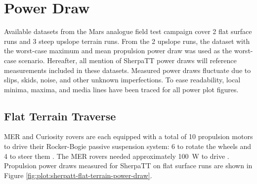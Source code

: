 \section{Power Draw}
\label{sec:PropulsionPowerConstraints:PowerDraw}
Available datasets from the Mars analogue field test campaign cover 2 flat surface runs and 3 steep upslope terrain runs. From the 2 upslope runs, the dataset with the worst-case maximum and mean propulsion power draw was used as the worst-case scenario. Hereafter, all mention of SherpaTT power draws will reference measurements included in these datasets. Measured power draws fluctuate due to slips, skids, noise, and other unknown imperfections. To ease readability, local minima, maxima, and media lines have been traced for all power plot figures.


\subsection{Flat Terrain Traverse}
\label{sec:PropulsionPowerConstraints:FlatTerrainTraverse}
MER and Curiosity rovers are each equipped with a total of 10 propulsion motors to drive their Rocker-Bogie passive suspension system: 6 to rotate the wheels and 4 to steer them  . The MER rovers needed approximately \SI{100}{\watt} to drive . Propulsion power draws measured for SherpaTT on flat surface runs are shown in Figure \ref{fig:plot:sherpatt-flat-terrain-power-draw}.

